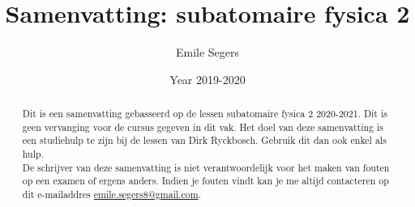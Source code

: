 \documentclass{article}
\title{Samenvatting: subatomaire fysica 2}
\author{Emile Segers}
\date{Year 2019-2020}
\begin{document}
\maketitle

\begin{abstract}
    Dit is een samenvatting gebasseerd op de lessen subatomaire fysica 2 2020-2021. Dit is geen vervanging voor de cursus gegeven in dit vak. Het doel van deze samenvatting is een studiehulp te zijn bij de lessen van Dirk Ryckbosch. Gebruik dit dan ook enkel als hulp.\\
    De schrijver van deze samenvatting is niet verantwoordelijk voor het maken van fouten op een examen of ergens anders. Indien je fouten vindt kan je me altijd contacteren op dit e-mailaddres \href{mailto:emile.segers8@gmail.com}{emile.segers8@gmail.com}.
    \end{abstract}


\end{document}
